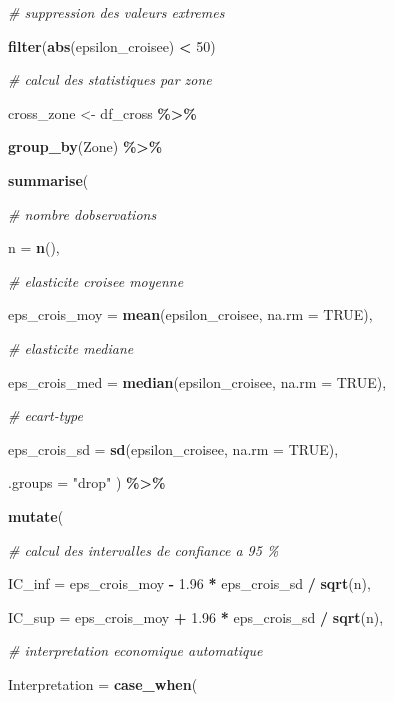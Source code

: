 \documentclass[
]{article}
\newenvironment{Shaded}{\begin{snugshade}}{\end{snugshade}}
\newcommand{\AttributeTok}[1]{\textcolor[rgb]{0.13,0.29,0.53}{#1}}
\newcommand{\CommentTok}[1]{\textcolor[rgb]{0.56,0.35,0.01}{\textit{#1}}}
\newcommand{\ConstantTok}[1]{\textcolor[rgb]{0.56,0.35,0.01}{#1}}
\newcommand{\DecValTok}[1]{\textcolor[rgb]{0.00,0.00,0.81}{#1}}
\newcommand{\FloatTok}[1]{\textcolor[rgb]{0.00,0.00,0.81}{#1}}
\newcommand{\FunctionTok}[1]{\textcolor[rgb]{0.13,0.29,0.53}{\textbf{#1}}}
\newcommand{\NormalTok}[1]{#1}
\newcommand{\OtherTok}[1]{\textcolor[rgb]{0.56,0.35,0.01}{#1}}
\newcommand{\SpecialCharTok}[1]{\textcolor[rgb]{0.81,0.36,0.00}{\textbf{#1}}}
\newcommand{\StringTok}[1]{\textcolor[rgb]{0.31,0.60,0.02}{#1}}
\begin{document}
\begin{Shaded}
\begin{Highlighting}[]
  \CommentTok{\# suppression des valeurs extremes}

  \FunctionTok{filter}\NormalTok{(}\FunctionTok{abs}\NormalTok{(epsilon\_croisee) }\SpecialCharTok{\textless{}} \DecValTok{50}\NormalTok{)}


\CommentTok{\# calcul des statistiques par zone}

\NormalTok{cross\_zone }\OtherTok{\textless{}{-}}\NormalTok{ df\_cross }\SpecialCharTok{\%\textgreater{}\%}

  \FunctionTok{group\_by}\NormalTok{(Zone) }\SpecialCharTok{\%\textgreater{}\%}

  \FunctionTok{summarise}\NormalTok{(}

    \CommentTok{\# nombre d\textquotesingle{}observations}

    \AttributeTok{n =} \FunctionTok{n}\NormalTok{(),}

    \CommentTok{\# elasticite croisee moyenne}

    \AttributeTok{eps\_crois\_moy =} \FunctionTok{mean}\NormalTok{(epsilon\_croisee, }\AttributeTok{na.rm =} \ConstantTok{TRUE}\NormalTok{),}

    \CommentTok{\# elasticite mediane}

    \AttributeTok{eps\_crois\_med =} \FunctionTok{median}\NormalTok{(epsilon\_croisee, }\AttributeTok{na.rm =} \ConstantTok{TRUE}\NormalTok{),}

    \CommentTok{\# ecart{-}type}

    \AttributeTok{eps\_crois\_sd =} \FunctionTok{sd}\NormalTok{(epsilon\_croisee, }\AttributeTok{na.rm =} \ConstantTok{TRUE}\NormalTok{),}

    \AttributeTok{.groups =} \StringTok{"drop"}
\NormalTok{  ) }\SpecialCharTok{\%\textgreater{}\%}

  \FunctionTok{mutate}\NormalTok{(}

    \CommentTok{\# calcul des intervalles de confiance a 95 \%}

    \AttributeTok{IC\_inf =}\NormalTok{ eps\_crois\_moy }\SpecialCharTok{{-}} \FloatTok{1.96} \SpecialCharTok{*}\NormalTok{ eps\_crois\_sd }\SpecialCharTok{/} \FunctionTok{sqrt}\NormalTok{(n),}

    \AttributeTok{IC\_sup =}\NormalTok{ eps\_crois\_moy }\SpecialCharTok{+} \FloatTok{1.96} \SpecialCharTok{*}\NormalTok{ eps\_crois\_sd }\SpecialCharTok{/} \FunctionTok{sqrt}\NormalTok{(n),}

    \CommentTok{\# interpretation economique automatique}

    \AttributeTok{Interpretation =} \FunctionTok{case\_when}\NormalTok{(}


\end{Highlighting}
\end{Shaded}
\end{document}
